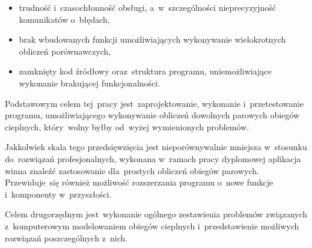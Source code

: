 \begin{itemize}

	\item trudność i~czasochłonność obsługi, a~w~szczególności
		nieprecyzyjność komunikatów o~błędach,

	\item brak wbudowanych funkcji umożliwiających wykonywanie
		wielokrotnych obliczeń porównawczych,

	\item zamknięty kod źródłowy oraz~struktura programu,
		uniemożliwiające wykonanie brakującej funkcjonalności.

\end{itemize}

Podstawowym celem tej~pracy jest~zaprojektowanie, wykonanie
i~przetestowanie programu, umożliwiającego wykonywanie obliczeń
dowolnych parowych obiegów cieplnych, który~wolny byłby od~wyżej
wymienionych problemów.

Jakkolwiek skala tego przedsięwzięcia jest nieporównywalnie mniejsza
w~stosunku do~rozwiązań profesjonalnych, wykonana w~ramach pracy
dyplomowej aplikacja winna znaleźć zastosowanie dla~prostych obliczeń
obiegów parowych. Przewiduje~się również możliwość rozszerzania programu
o~nowe funkcje i~komponenty w~przyszłości.

Celem drugorzędnym jest~wykonanie ogólnego zestawienia problemów
związanych z~komputerowym modelowaniem obiegów cieplnych
i~przedstawienie możliwych rozwiązań poszczególnych z~nich.
